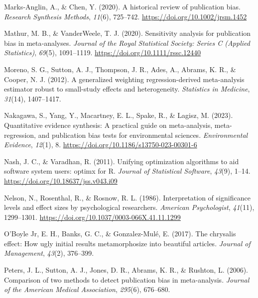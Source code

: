 \documentclass[
  man, donotrepeattitle,floatsintext]{apa7}
\newlength{\cslhangindent}
\newenvironment{CSLReferences}[2] %
 {\begin{list}{}{%
  \setlength{\itemindent}{0pt}
  \setlength{\leftmargin}{0pt}
  \setlength{\parsep}{0pt}
  \ifodd #1
   \setlength{\leftmargin}{\cslhangindent}
   \setlength{\itemindent}{-1\cslhangindent}
  \fi
  \setlength{\itemsep}{#2\baselineskip}}}
 {\end{list}}
\begin{document}
\begin{CSLReferences}{1}{0}
Marks‐Anglin, A., \& Chen, Y. (2020). A historical review of publication bias. \emph{Research Synthesis Methods}, \emph{11}(6), 725--742. \url{https://doi.org/10.1002/jrsm.1452}

Mathur, M. B., \& VanderWeele, T. J. (2020). Sensitivity analysis for publication bias in meta‐analyses. \emph{Journal of the Royal Statistical Society: Series C (Applied Statistics)}, \emph{69}(5), 1091--1119. \url{https://doi.org/10.1111/rssc.12440}

Moreno, S. G., Sutton, A. J., Thompson, J. R., Ades, A., Abrams, K. R., \& Cooper, N. J. (2012). A generalized weighting regression-derived meta-analysis estimator robust to small-study effects and heterogeneity. \emph{Statistics in Medicine}, \emph{31}(14), 1407--1417.

Nakagawa, S., Yang, Y., Macartney, E. L., Spake, R., \& Lagisz, M. (2023). Quantitative evidence synthesis: A practical guide on meta-analysis, meta-regression, and publication bias tests for environmental sciences. \emph{Environmental Evidence}, \emph{12}(1), 8. \url{https://doi.org/10.1186/s13750-023-00301-6}

Nash, J. C., \& Varadhan, R. (2011). Unifying optimization algorithms to aid software system users: {optimx} for {R}. \emph{Journal of Statistical Software}, \emph{43}(9), 1--14. \url{https://doi.org/10.18637/jss.v043.i09}

Nelson, N., Rosenthal, R., \& Rosnow, R. L. (1986). Interpretation of significance levels and effect sizes by psychological researchers. \emph{American Psychologist}, \emph{41}(11), 1299--1301. \url{https://doi.org/10.1037/0003-066X.41.11.1299}

O'Boyle Jr, E. H., Banks, G. C., \& Gonzalez-Mulé, E. (2017). The chrysalis effect: How ugly initial results metamorphosize into beautiful articles. \emph{Journal of Management}, \emph{43}(2), 376--399.

Peters, J. L., Sutton, A. J., Jones, D. R., Abrams, K. R., \& Rushton, L. (2006). Comparison of two methods to detect publication bias in meta-analysis. \emph{Journal of the American Medical Association}, \emph{295}(6), 676--680.


\end{CSLReferences}
\end{document}
